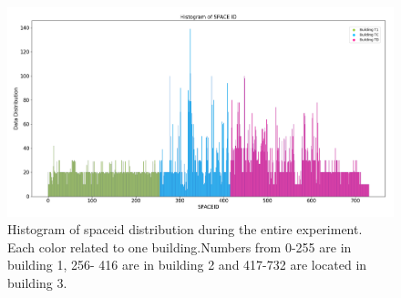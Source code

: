 \begin{figure}
    \centering
    \includegraphics[width = 16 cm]{image/Chapters/Chapter6/uniqspaceid.png}
    \caption{Histogram of spaceid distribution during the entire experiment. Each color related to one building.Numbers from 0-255 are in building 1, 256- 416 are in building 2 and 417-732 are located in building 3.}
    \label{spaceiduniq }
\end{figure}







